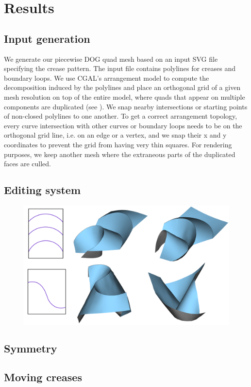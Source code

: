 \section{Results} \label{sec:results}
\subsection{Input generation}
We generate our piecewise DOG quad mesh based on an input SVG file specifying the crease pattern. The input file contains polylines for creases and boundary loops. We use CGAL's arrangement model \cite{cgal,cgal_arr1,cgal_arr2} to compute the decomposition induced by the polylines and place an orthogonal grid of a given mesh resolution on top of the entire model, where quads that appear on multiple components are duplicated (see ). We snap nearby intersections or starting points of non-closed polylines to one another. To get a correct arrangement topology, every curve intersection with other curves or boundary loops needs to be on the orthogonal grid line, i.e. on an edge or a vertex, and we snap their x and y coordinates to prevent the grid from having very thin squares. For rendering purposes, we keep another mesh where the extraneous parts of the duplicated faces are culled.
\subsection{Editing system}
\begin{figure} [h]
	\centering
	\includegraphics[width=\linewidth]{figures/MV_bias_modeling}
	\caption{}
	\label{fig:MV_bias_modeling}
\end{figure}
\subsection{Symmetry}
\subsection{Moving creases}